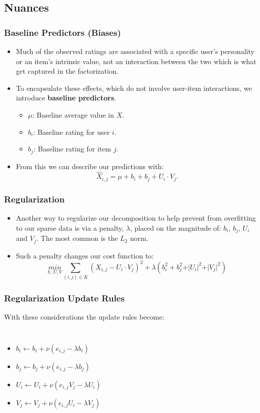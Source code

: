 \documentclass{beamer}
\begin{document}
\subsection{Nuances}
\begin{frame}
  \frametitle{Baseline Predictors (Biases)}
  \begin{itemize}
    \item Much of the observed ratings are associated with a specific user's personality or an item's intrinsic value, not an interaction between the two which is what get captured in the factorization.
    \item To encapsulate these effects, which do not involve user-item interactions, we introduce \textbf{baseline predictors}.
    \begin{itemize}
      \item $\mu$: Baseline average value in $X$.
      \item $b_i$: Baseline rating for user $i$.
      \item $b_j$: Baseline rating for item $j$.
    \end{itemize}
    \item From this we can describe our predictions with: 
      $$ \hat{X}_{i,j} = \mu + b_i + b_j + U_i \cdot V_j. $$
  \end{itemize}
\end{frame}

\begin{frame}
  \frametitle{Regularization}
  \begin{itemize}
    \item Another way to regularize our decomposition to help prevent from overfitting to our sparse data is via a penalty, $\lambda$, placed on the magnitude of: $b_i$, $b_j$, $U_i$ and $V_j$. The most common is the $L_2$ norm. \vspace{2mm}
    \item Such a penalty changes our cost function to:
      $$ \underset{b_:, U,V}{min} \sum\limits_{(i,j) \in K} (X_{i,j} - U_i \cdot V_j)^2 + \lambda(b_i^2 + b_j^2 + \vert U_i \vert^2 + \vert V_j \vert^2)$$
  \end{itemize}
\end{frame}

\begin{frame}
  \frametitle{Regularization Update Rules}
  With these considerations the update rules become:

  \begin{columns}
    \begin{itemize}
      \item $b_i \leftarrow b_i + \nu(e_{i,j} - \lambda b_i)$
      \item $b_j \leftarrow b_j + \nu(e_{i,j} - \lambda b_j)$
      \item $U_i \leftarrow U_i + \nu(e_{i,j}V_j - \lambda U_i)$
      \item $V_j \leftarrow V_j + \nu(e_{i,j}U_i - \lambda V_j)$
    \end{itemize}
  \end{columns}
\end{frame}
\end{document}
